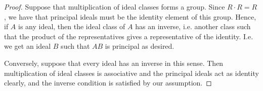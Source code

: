 \begin{proof}
    Suppose that multiplication of ideal classes forms a group. Since $R \cdot R = R$, we have that principal ideals must be the identity element of this group. Hence, if $A$ is any ideal, then the ideal class of $A$ has an inverse, i.e. another class such that the product of the representatives gives a representative of the identity. I.e. we get an ideal $B$ such that $AB$ is principal as desired.

    Conversely, suppose that every ideal has an inverse in this sense. Then multiplication of ideal classes is associative and the principal ideals act as identity clearly, and the inverse condition is satisfied by our assumption.
\end{proof}